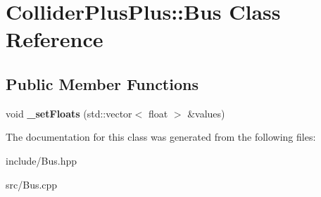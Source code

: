 \hypertarget{classColliderPlusPlus_1_1Bus}{\section{Collider\-Plus\-Plus\-:\-:Bus Class Reference}
\label{classColliderPlusPlus_1_1Bus}
}
\subsection*{Public Member Functions}
\begin{DoxyCompactItemize}
\item 
\hypertarget{classColliderPlusPlus_1_1Bus_ad2004886f74af2095a0ea06b1048fc95}{void {\bfseries \-\_\-set\-Floats} (std\-::vector$<$ float $>$ \&values)}\label{classColliderPlusPlus_1_1Bus_ad2004886f74af2095a0ea06b1048fc95}

\end{DoxyCompactItemize}


The documentation for this class was generated from the following files\-:\begin{DoxyCompactItemize}
\item 
include/Bus.\-hpp\item 
src/Bus.\-cpp\end{DoxyCompactItemize}
